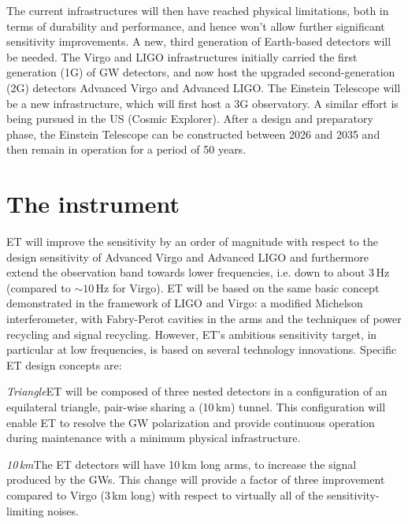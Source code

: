 The current infrastructures will then have reached physical limitations,
both in terms of durability and performance, and hence won't allow further 
significant sensitivity improvements. A new, third generation of
Earth-based detectors will be needed.
The Virgo and LIGO infrastructures initially carried the first generation
(1G) of GW detectors, and now host the upgraded second-generation (2G) detectors
Advanced Virgo and Advanced LIGO.
The Einstein Telescope will be a new infrastructure, which will first host a 3G
observatory. A similar effort is being pursued in the US (Cosmic Explorer).
After a design and preparatory phase, the Einstein Telescope can be constructed
between 2026 and 2035 and then remain in operation for a period of 50 years. 

\vspace{5mm}
\section*{The instrument}
ET will improve the sensitivity by an order of magnitude with respect to the
design sensitivity of Advanced Virgo and Advanced LIGO and furthermore extend
the observation band towards lower frequencies, i.e. down to 
about 3\,Hz
(compared to $\sim 10$\,Hz for Virgo). ET will be based on
the same basic concept demonstrated in the framework of LIGO and Virgo: a
modified Michelson interferometer, with Fabry-Perot cavities in the arms and the
techniques of power recycling and signal recycling. However, ET's ambitious
sensitivity target, in particular at low frequencies, is based on several 
technology innovations. Specific ET design concepts are: 

\textit{Triangle}\quad ET will be composed of three nested detectors in a
configuration of an equilateral triangle, pair-wise sharing a (10\,km) tunnel.
This configuration will enable ET to resolve the GW polarization and provide
continuous operation during maintenance with a minimum physical infrastructure.

\textit{10\,km}\quad The ET detectors will have 10\,km long arms, to
increase the signal produced by the GWs. 
This change will provide a factor of three improvement compared to Virgo (3\,km long) with respect to virtually all of the sensitivity-limiting noises.

